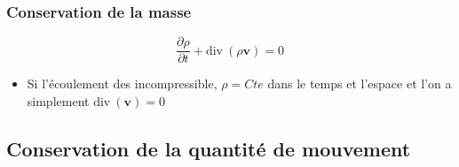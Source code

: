 \documentclass[%
	final, %
	 10pt, %
 	compress, %
hyperref={bookmarks=true}	
]{beamer}
\renewcommand{\v}[1]{\ensuremath{\bm{#1}}} %
\newcommand{\ddr}[1]{\, \mathrm{d} #1}
\newcommand{\diver}[1]{\textrm{div} \ {#1}}
\begin{document}
\begin{frame}\frametitle{Conservation de la masse}
\begin{dmath*}
\dfrac{\partial \rho}{\partial t} + \diver{(\rho \v{v})} = 0
\end{dmath*}
\begin{itemize}
\item Si l'écoulement des incompressible, $\rho = Cte$ dans le temps
  et l'espace et l'on a simplement $\diver{(\v{v})} = 0$
\end{itemize}
\end{frame}


\subsection{Conservation de la quantité de mouvement}
\label{sec:conservation-de-la-1}

\end{document}

